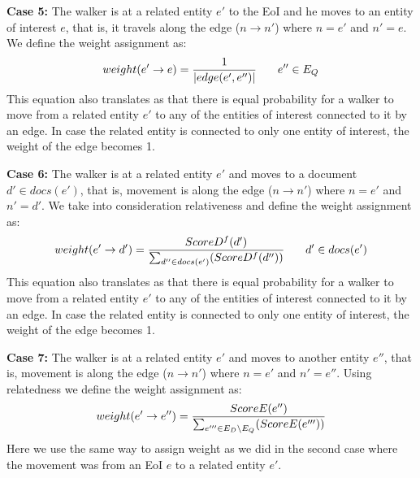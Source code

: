 \documentclass{article}
\begin{document}
\vspace{2mm}\noindent
{\bf Case 5:} The walker is at a related entity $e'$ to the EoI and he 
moves to an entity of interest $e$, that is, it travels along the edge 
($n \rightarrow n'$) where $n=e'$ and $n'=e$. 
We define the weight assignment as:         
\begin{equation}
\begin{split}
\small
weight(e' \rightarrow e) = \frac{1}{|edge(e', e'')|} \qquad e'' \in E_Q
\end{split}
\end{equation}
This equation also translates as that there is equal probability for a
walker to move from a related entity $e'$ to any of the entities of interest
connected to it by an edge. In case the related entity is connected to only one 
entity of interest, the weight of the edge becomes 1.

\vspace{2mm}\noindent
{\bf Case 6:} The walker is at a related entity $e'$ and  
moves to a document $d' \in docs(e')$, that is, movement is along the edge 
($n \rightarrow n'$) where $n=e'$ and $n'=d'$. 
We take into consideration relativeness and define the weight assignment as:         
\begin{equation}
\begin{split}
\small
weight(e' \rightarrow d') = \frac{ScoreD^{f}(d')}{\sum_{d'' \in docs(e')}(ScoreD^{f}(d''))} \qquad d' \in docs(e')
\end{split}
\end{equation}
This equation also translates as that there is equal probability for a
walker to move from a related entity $e'$ to any of the entities of interest
connected to it by an edge. In case the related entity is connected to only one 
entity of interest, the weight of the edge becomes 1.

\vspace{2mm}\noindent
{\bf Case 7:} The walker is at a related entity $e'$ and  
moves to another entity $e''$, that is, movement is along the edge 
($n \rightarrow n'$) where $n=e'$ and $n'=e''$. 
Using relatedness we define the weight assignment as:         
\begin{equation}
\begin{split}
\small
weight(e' \rightarrow e'') = \frac{ScoreE(e'')}{\sum_{e''' \in E_D \setminus E_Q}(ScoreE(e'''))} 
\end{split}
\end{equation}
Here we use the same way to assign weight as we did in the second case where
the movement was from an EoI $e$ to a related entity $e'$.
\end{document}
